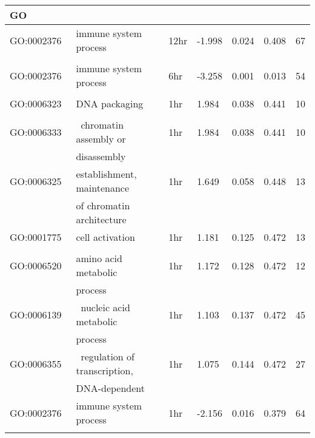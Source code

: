 \begin{table}[!ht]
\begin{tabular}{lllllll}
            \textbf{GO}   \\ \midrule
GO:0002376  & immune system process                  & 12hr & -1.998 & 0.024   & 0.408   & 67  \\
            &                                        &      &        &         &         &     \\ \hline
GO:0002376  & immune system process                  & 6hr  & -3.258 & 0.001   & 0.013   & 54  \\
            &                                        &      &        &         &         &     \\ \hline
GO:0006323~ & DNA packaging                          & 1hr  & 1.984  & 0.038   & 0.441   & 10  \\
            &                                        &      &        &         &         &     \\ \hline
GO:0006333  & ~chromatin assembly or~                & 1hr  & 1.984  & 0.038   & 0.441   & 10  \\
            & disassembly                            &      &        &         &         &     \\ \hline
GO:0006325~ & establishment, maintenance~       & 1hr  & 1.649  & 0.058   & 0.448   & 13  \\
            & of chromatin architecture                 &      &        &         &         &     \\ \hline
GO:0001775~ & cell activation                        & 1hr  & 1.181  & 0.125   & 0.472   & 13  \\
            &                                        &      &        &         &         &     \\ \hline
GO:0006520~ & amino acid metabolic            & 1hr  & 1.172  & 0.128   & 0.472   & 12  \\
            &     process                                   &      &        &         &         &     \\ \hline
GO:0006139  & ~nucleic acid metabolic ~ & 1hr  & 1.103  & 0.137   & 0.472   & 45  \\
            &    process   &      &        &         &         &     \\ \hline
GO:0006355  & ~regulation of transcription,~         & 1hr  & 1.075  & 0.144   & 0.472   & 27  \\
            & DNA-dependent                          &      &        &         &         &     \\ \hline
GO:0002376  & immune system process                  & 1hr  & -2.156 & 0.016   & 0.379   & 64  \\
            &                                        &      &        &         &         &    \\ \bottomrule
\end{tabular}
\end{table}
\clearpage
\pagebreak


